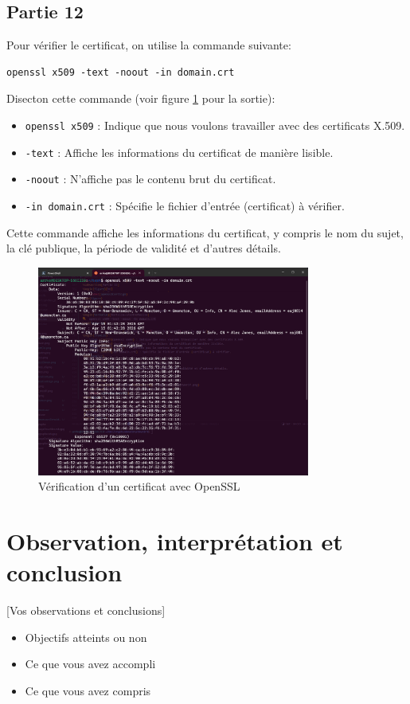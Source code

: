 \documentclass[12pt,a4paper]{article}
\begin{document}
\subsection{Partie 12}
Pour vérifier le certificat, on utilise la commande suivante:
\begin{Verbatim}[fontsize=\footnotesize]
    openssl x509 -text -noout -in domain.crt
\end{Verbatim}

Disecton cette commande (voir figure \ref{opensslCertVerif} pour la sortie):
\begin{itemize}
    \item \texttt{openssl x509} : Indique que nous voulons travailler avec des certificats X.509.
    \item \texttt{-text} : Affiche les informations du certificat de manière lisible.
    \item \texttt{-noout} : N'affiche pas le contenu brut du certificat.
    \item \texttt{-in domain.crt} : Spécifie le fichier d'entrée (certificat) à vérifier.
\end{itemize}

Cette commande affiche les informations du certificat,
y compris le nom du sujet, la clé publique, la période de validité et d'autres détails.

\begin{figure}[ht]
    \centering
    \includegraphics[width=0.8\textwidth]{../img/opensslCertVerif.png}
    \caption{Vérification d'un certificat avec OpenSSL}
    \label{opensslCertVerif}
\end{figure}


\section{Observation, interprétation et conclusion}
 [Vos observations et conclusions]
\begin{itemize}
    \item Objectifs atteints ou non
    \item Ce que vous avez accompli
    \item Ce que vous avez compris
\end{itemize}
\end{document}
